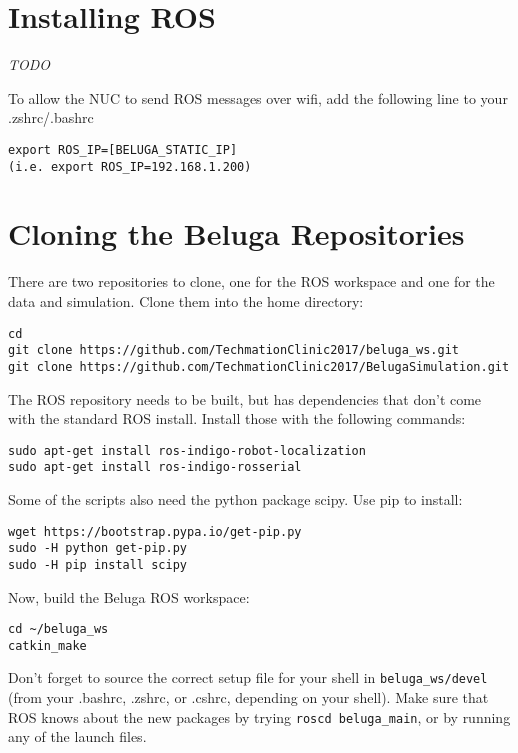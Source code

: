 \documentclass{article}
\newcommand{\todo}{ \begin{center} \large \emph{TODO} \end{center}}
\begin{document}
\section*{Installing ROS}
\todo
To allow the NUC to send ROS messages over wifi, add the following line to your .zshrc/.bashrc \begin{verbatim}
export ROS_IP=[BELUGA_STATIC_IP]
(i.e. export ROS_IP=192.168.1.200)
\end{verbatim}

\section*{Cloning the Beluga Repositories}
There are two repositories to clone, one for the ROS workspace and one for the data and simulation.
Clone them into the home directory:

\begin{verbatim}
cd
git clone https://github.com/TechmationClinic2017/beluga_ws.git
git clone https://github.com/TechmationClinic2017/BelugaSimulation.git
\end{verbatim}

The ROS repository needs to be built, but has dependencies that don't come with the standard ROS install.
Install those with the following commands:

\begin{verbatim}
sudo apt-get install ros-indigo-robot-localization
sudo apt-get install ros-indigo-rosserial
\end{verbatim}

Some of the scripts also need the python package scipy.
Use pip to install:
\begin{verbatim}
wget https://bootstrap.pypa.io/get-pip.py
sudo -H python get-pip.py
sudo -H pip install scipy
\end{verbatim}

Now, build the Beluga ROS workspace:

\begin{verbatim}
cd ~/beluga_ws
catkin_make
\end{verbatim}

Don't forget to source the correct setup file for your shell in \texttt{beluga\_ws/devel} (from your .bashrc, .zshrc, or .cshrc, depending on your shell).
Make sure that ROS knows about the new packages by trying \texttt{roscd beluga\_main}, or by running any of the launch files.
\end{document}
